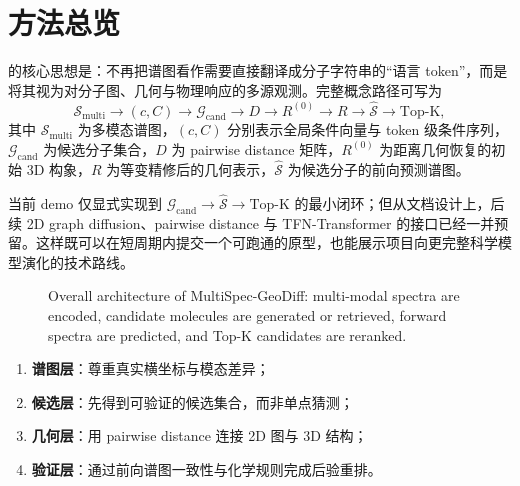 \section{方法总览}
\projectname{} 的核心思想是：不再把谱图看作需要直接翻译成分子字符串的“语言 token”，而是将其视为对分子图、几何与物理响应的多源观测。完整概念路径可写为
\[
\mathcal{S}_{\mathrm{multi}}
\rightarrow
(c, C)
\rightarrow
\mathcal{G}_{\mathrm{cand}}
\rightarrow
D
\rightarrow
R^{(0)}
\rightarrow
R
\rightarrow
\hat{\mathcal{S}}
\rightarrow
\mathrm{Top\mbox{-}K},
\]
其中 $\mathcal{S}_{\mathrm{multi}}$ 为多模态谱图，$(c, C)$ 分别表示全局条件向量与 token 级条件序列，$\mathcal{G}_{\mathrm{cand}}$ 为候选分子集合，$D$ 为 pairwise distance 矩阵，$R^{(0)}$ 为距离几何恢复的初始 3D 构象，$R$ 为等变精修后的几何表示，$\hat{\mathcal{S}}$ 为候选分子的前向预测谱图。

当前 demo 仅显式实现到 $\mathcal{G}_{\mathrm{cand}} \rightarrow \hat{\mathcal{S}} \rightarrow \mathrm{Top\mbox{-}K}$ 的最小闭环；但从文档设计上，后续 2D graph diffusion、pairwise distance 与 TFN-Transformer 的接口已经一并预留。这样既可以在短周期内提交一个可跑通的原型，也能展示项目向更完整科学模型演化的技术路线。

\begin{figure}[htbp]
  \centering
  
  \caption{Overall architecture of MultiSpec-GeoDiff: multi-modal spectra are encoded, candidate molecules are generated or retrieved, forward spectra are predicted, and Top-K candidates are reranked.}
\end{figure}

\begin{keybox}[方法分层]
\begin{enumerate}
  \item \textbf{谱图层}：尊重真实横坐标与模态差异；
  \item \textbf{候选层}：先得到可验证的候选集合，而非单点猜测；
  \item \textbf{几何层}：用 pairwise distance 连接 2D 图与 3D 结构；
  \item \textbf{验证层}：通过前向谱图一致性与化学规则完成后验重排。
\end{enumerate}
\end{keybox}
